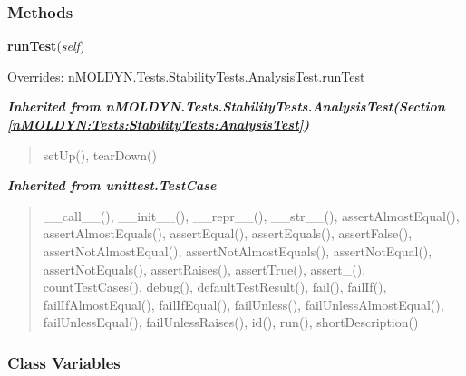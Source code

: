 
  \subsubsection{Methods}

    \vspace{0.5ex}

\hspace{.8\funcindent}\begin{boxedminipage}{\funcwidth}

    \raggedright \textbf{runTest}(\textit{self})

\setlength{\parskip}{2ex}
\setlength{\parskip}{1ex}
      Overrides: nMOLDYN.Tests.StabilityTests.AnalysisTest.runTest

    \end{boxedminipage}


\large{\textbf{\textit{Inherited from nMOLDYN.Tests.StabilityTests.AnalysisTest\textit{(Section \ref{nMOLDYN:Tests:StabilityTests:AnalysisTest})}}}}

\begin{quote}
setUp(), tearDown()
\end{quote}

\large{\textbf{\textit{Inherited from unittest.TestCase}}}

\begin{quote}
\_\_call\_\_(), \_\_init\_\_(), \_\_repr\_\_(), \_\_str\_\_(), assertAlmostEqual(), assertAlmostEquals(), assertEqual(), assertEquals(), assertFalse(), assertNotAlmostEqual(), assertNotAlmostEquals(), assertNotEqual(), assertNotEquals(), assertRaises(), assertTrue(), assert\_(), countTestCases(), debug(), defaultTestResult(), fail(), failIf(), failIfAlmostEqual(), failIfEqual(), failUnless(), failUnlessAlmostEqual(), failUnlessEqual(), failUnlessRaises(), id(), run(), shortDescription()
\end{quote}


  \subsubsection{Class Variables}

